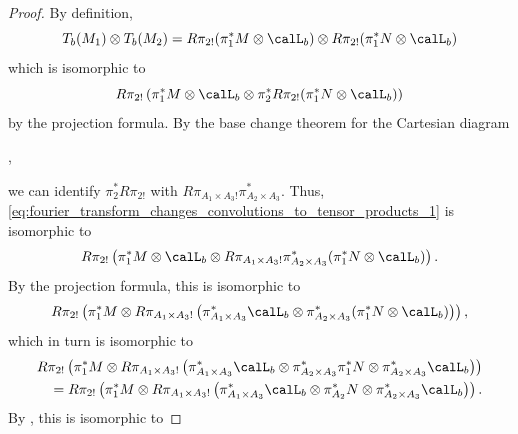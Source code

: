 \begin{proof}
    By definition,
    $$T_b(M_1) \otimes T_b(M_2) = R\pi_{2!} (\pi_1^* M \otimes \calL_b) \otimes R\pi_{2!} (\pi_1^* N \otimes \calL_b)$$
    which is isomorphic to 
    \begin{equation}
    R\pi_{2!}\left( \pi_1^* M \otimes \calL_b \otimes \pi_2^* R\pi_{2!} (\pi_1^* N \otimes \calL_b)\right) \label{eq:fourier_transform_changes_convolutions_to_tensor_products_1}
    \end{equation}
    by the projection formula. By the base change theorem for the Cartesian diagram
    \begin{center}
        ,
    \end{center}
    we can identify $\pi_2^* R\pi_{2!}$ with $R\pi_{A_1 \times A_3 !} \pi_{A_2 \times A_3}^*$. Thus, \eqref{eq:fourier_transform_changes_convolutions_to_tensor_products_1} is isomorphic to 
    \begin{equation*}
    R\pi_{2!}\left( \pi_1^* M \otimes \calL_b \otimes R\pi_{A_1 \times A_3 !} \pi_{A_2 \times A_3}^* (\pi_1^* N \otimes \calL_b)\right).
    \end{equation*}
    By the projection formula, this is isomorphic to 
    \begin{equation*}
    R\pi_{2!}\left( \pi_1^* M \otimes R\pi_{A_1 \times A_3 !}  \left(\pi_{A_1 \times A_3}^* \calL_b \otimes \pi_{A_2 \times A_3}^* (\pi_1^* N \otimes \calL_b) \right) \right),
    \end{equation*}
    which in turn is isomorphic to 
    \begin{align*}
    R\pi_{2!}\left( \pi_1^* M \otimes R\pi_{A_1 \times A_3 !} \left(\pi_{A_1 \times A_3}^* \calL_b \otimes \pi_{A_2 \times A_3}^* \pi_1^* N \otimes \pi_{A_2 \times A_3}^* \calL_b \right) \right) \\
    = R\pi_{2!}\left( \pi_1^* M \otimes R\pi_{A_1 \times A_3 !} \left(\pi_{A_1 \times A_3}^* \calL_b \otimes \pi_{A_2}^* N \otimes \pi_{A_2 \times A_3}^* \calL_b \right) \right).
    \end{align*}
    By , this is isomorphic to 

\end{proof}
